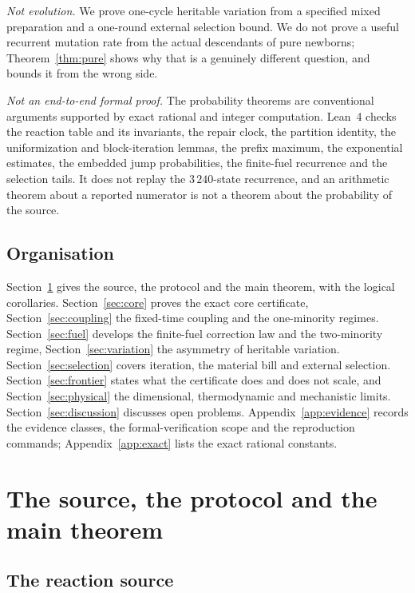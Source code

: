 \documentclass[11pt,a4paper]{article}
\theoremstyle{plain}
\theoremstyle{definition}
\theoremstyle{remark}
\begin{document}
\emph{Not evolution.} We prove one-cycle heritable variation from a specified mixed
preparation and a one-round external selection bound. We do not prove a useful recurrent
mutation rate from the actual descendants of pure newborns; Theorem~\ref{thm:pure} shows
why that is a genuinely different question, and bounds it from the wrong side.

\emph{Not an end-to-end formal proof.} The probability theorems are conventional
arguments supported by exact rational and integer computation. Lean~4 checks the reaction
table and its invariants, the repair clock, the partition identity, the uniformization
and block-iteration lemmas, the prefix maximum, the exponential estimates, the embedded
jump probabilities, the finite-fuel recurrence and the selection tails. It does not
replay the $3\,240$-state recurrence, and an arithmetic theorem about a reported
numerator is not a theorem about the probability of the source.

\subsection{Organisation}

Section~\ref{sec:model} gives the source, the protocol and the main theorem, with the
logical corollaries. Section~\ref{sec:core} proves the exact core certificate,
Section~\ref{sec:coupling} the fixed-time coupling and the one-minority regimes.
Section~\ref{sec:fuel} develops the finite-fuel correction law and the two-minority
regime, Section~\ref{sec:variation} the asymmetry of heritable variation.
Section~\ref{sec:selection} covers iteration, the material bill and external selection.
Section~\ref{sec:frontier} states what the certificate does and does not scale, and
Section~\ref{sec:physical} the dimensional, thermodynamic and mechanistic limits.
Section~\ref{sec:discussion} discusses open problems. Appendix~\ref{app:evidence} records
the evidence classes, the formal-verification scope and the reproduction commands;
Appendix~\ref{app:exact} lists the exact rational constants.

\section{The source, the protocol and the main theorem}\label{sec:model}

\subsection{The reaction source}
\end{document}

